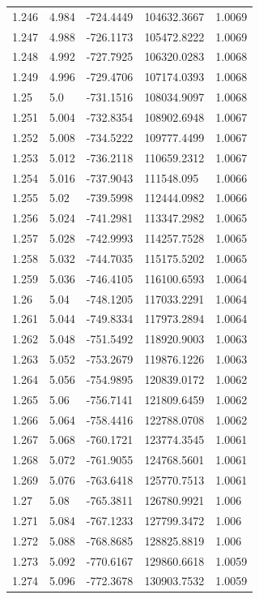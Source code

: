 \begin{tabular}{lllll}
1.246 & 4.984 & -724.4449 & 104632.3667 & 1.0069 \\
1.247 & 4.988 & -726.1173 & 105472.8222 & 1.0069 \\
1.248 & 4.992 & -727.7925 & 106320.0283 & 1.0068 \\
1.249 & 4.996 & -729.4706 & 107174.0393 & 1.0068 \\
1.25 & 5.0 & -731.1516 & 108034.9097 & 1.0068 \\
1.251 & 5.004 & -732.8354 & 108902.6948 & 1.0067 \\
1.252 & 5.008 & -734.5222 & 109777.4499 & 1.0067 \\
1.253 & 5.012 & -736.2118 & 110659.2312 & 1.0067 \\
1.254 & 5.016 & -737.9043 & 111548.095 & 1.0066 \\
1.255 & 5.02 & -739.5998 & 112444.0982 & 1.0066 \\
1.256 & 5.024 & -741.2981 & 113347.2982 & 1.0065 \\
1.257 & 5.028 & -742.9993 & 114257.7528 & 1.0065 \\
1.258 & 5.032 & -744.7035 & 115175.5202 & 1.0065 \\
1.259 & 5.036 & -746.4105 & 116100.6593 & 1.0064 \\
1.26 & 5.04 & -748.1205 & 117033.2291 & 1.0064 \\
1.261 & 5.044 & -749.8334 & 117973.2894 & 1.0064 \\
1.262 & 5.048 & -751.5492 & 118920.9003 & 1.0063 \\
1.263 & 5.052 & -753.2679 & 119876.1226 & 1.0063 \\
1.264 & 5.056 & -754.9895 & 120839.0172 & 1.0062 \\
1.265 & 5.06 & -756.7141 & 121809.6459 & 1.0062 \\
1.266 & 5.064 & -758.4416 & 122788.0708 & 1.0062 \\
1.267 & 5.068 & -760.1721 & 123774.3545 & 1.0061 \\
1.268 & 5.072 & -761.9055 & 124768.5601 & 1.0061 \\
1.269 & 5.076 & -763.6418 & 125770.7513 & 1.0061 \\
1.27 & 5.08 & -765.3811 & 126780.9921 & 1.006 \\
1.271 & 5.084 & -767.1233 & 127799.3472 & 1.006 \\
1.272 & 5.088 & -768.8685 & 128825.8819 & 1.006 \\
1.273 & 5.092 & -770.6167 & 129860.6618 & 1.0059 \\
1.274 & 5.096 & -772.3678 & 130903.7532 & 1.0059 \\

\end{tabular}
